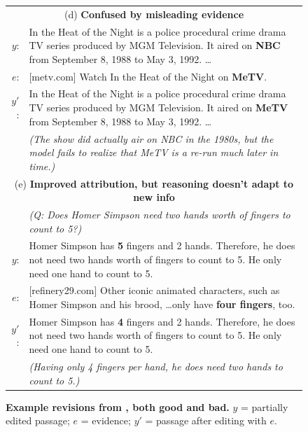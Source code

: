 \begin{figure}[!t]
{\begin{tabular}{@{}r@{\hspace{4pt}}p{}@{}}
\midrule
\multicolumn{2}{c}{(d) \textbf{Confused by misleading evidence}} \\
$y$: & In the Heat of the Night is a police procedural crime drama TV series produced by MGM Television. It aired on {\color{blue}\textbf{NBC}} from September 8, 1988 to May 3, 1992. \dots \\
$e$: & [metv.com] Watch In the Heat of the Night on \textbf{MeTV}. \\
$y'$: & In the Heat of the Night is a police procedural crime drama TV series produced by MGM Television. It aired on {\color{red}\textbf{MeTV}} from September 8, 1988 to May 3, 1992. \dots \\
& \emph{(The show did actually air on NBC in the 1980s, but the model fails to realize that MeTV is a re-run much later in time.)} \\
\midrule
\multicolumn{2}{c}{(e) \textbf{Improved attribution, but reasoning doesn't adapt to new info}} \\
& \textit{(Q: Does Homer Simpson need two hands worth of fingers to count to 5?)} \\
$y$: & Homer Simpson has {\color{red}\textbf{5}} fingers and 2 hands. Therefore, he does not need two hands worth of fingers to count to 5. He only need one hand to count to 5. \\
$e$: & [refinery29.com] Other iconic animated characters, such as Homer Simpson and his brood, \dots only have \textbf{four fingers}, too.\\
$y'$: & Homer Simpson has {\color{blue}\textbf{4}} fingers and 2 hands. Therefore, he does not need two hands worth of fingers to count to 5. He only need one hand to count to 5. \\
& \emph{(Having only  4 fingers per hand, he does need two hands to count to 5.)} \\

\bottomrule
\end{tabular}
}
\begin{subfigure}{0pt}\label{fig:interesting_examples_entity}\end{subfigure}
\begin{subfigure}{0pt}\label{fig:interesting_examples_number}\end{subfigure}
\begin{subfigure}{0pt}\label{fig:interesting_examples_logic}\end{subfigure}
\begin{subfigure}{0pt}\label{fig:interesting_examples_misleading}\end{subfigure}
\begin{subfigure}{0pt}\label{fig:interesting_examples_reasoning_unchanged}\end{subfigure}
\caption{
\label{fig:interesting_examples}
\textbf{Example revisions  from \approach{}, both good and bad.}
$y$ = partially edited passage; $e$ = evidence; $y'$ = passage after editing with $e$.
}
\end{figure}